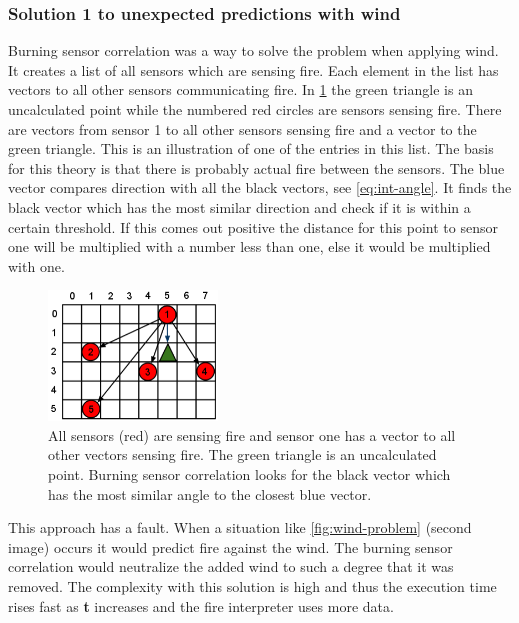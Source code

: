 \subsubsection{Solution 1 to unexpected predictions with wind}
Burning sensor correlation was a way to solve the problem when applying wind. It creates a list of all sensors which are sensing fire. Each element in the list has vectors to all other sensors communicating fire. In \ref{fig:burning-sensor-correlation} the green triangle is an uncalculated point while the numbered red circles are sensors sensing fire. There are vectors from sensor 1 to all other sensors sensing fire and a vector to the green triangle. This is an illustration of one of the entries in this list. The basis for this theory is that there is probably actual fire between the sensors. The blue vector compares direction with all the black vectors, see \ref{eq:int-angle}. It finds the black vector which has the most similar direction and check if it is within a certain threshold. If this comes out positive the distance for this point to sensor one will be multiplied with a number less than one, else it would be multiplied with one.
\begin{figure}[here]
  \centering
      \includegraphics[width=0.4\textwidth]{solution/graphics/burning-sensor-correlation.png}
  \caption{All sensors (red) are sensing fire and sensor one has a vector to all other vectors sensing fire. The green triangle is an uncalculated point. Burning sensor correlation looks for the black vector which has the most similar angle to the closest blue vector.}
  \label{fig:burning-sensor-correlation}
\end{figure}
This approach has a fault. When a situation like \ref{fig:wind-problem} (second image) occurs it would predict fire against the wind. The burning sensor correlation would neutralize the added wind to such a degree that it was removed. The complexity with this solution is high and thus the execution time rises fast as \textbf{t} increases and the fire interpreter uses more data. 
